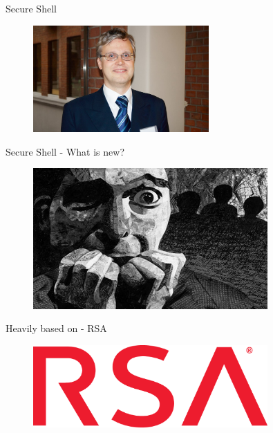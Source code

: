 \documentclass[10pt, compress, aspectratio=169]{beamer}
\begin{document}
\begin{frame}{Secure Shell}
  \begin{figure}[ht]
    \centering
    \includegraphics[width=0.6\textwidth, keepaspectratio=true]{images/TatuYlonen.jpg}
  \end{figure}
\end{frame}

\begin{frame}{Secure Shell - What is new?}
  \pause
  \begin{figure}[ht]
    \centering
    \includegraphics[width=0.8\textwidth, keepaspectratio=true]{images/paranoia.jpg}
  \end{figure}
\end{frame}

\begin{frame}{Heavily based on - RSA}
  \begin{figure}[ht]
    \centering
    \includegraphics[width=0.8\textwidth, keepaspectratio=true]{images/rsa.png}
  \end{figure}
\end{frame}
\end{document}
